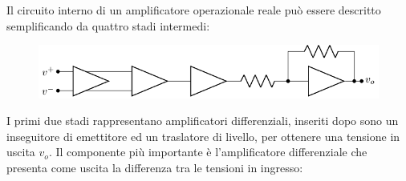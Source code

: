 \documentclass{article}
\numberwithin{equation}{subsection}
\begin{document}
Il circuito interno di un amplificatore operazionale reale può essere descritto semplificando da quattro stadi intermedi:
\begin{figure}[H]%
    \centering
    \includegraphics{amplificatore-stadi.pdf}
\end{figure}
I primi due stadi rappresentano amplificatori differenziali, inseriti dopo sono un inseguitore di emettitore ed un traslatore di livello, per ottenere 
una tensione in uscita $v_o$. Il componente più importante è l'amplificatore differenziale che presenta come uscita la differenza tra le tensioni in ingresso:
\end{document}
